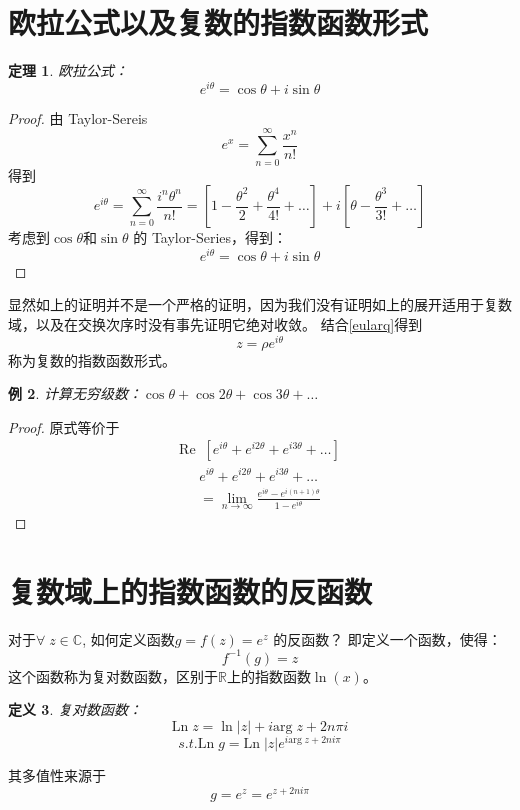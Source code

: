 \documentclass[10pt, a4paper, oneside]{ctexbook}
\newtheorem{theorem}{定理}[section]
\newtheorem{definition}[theorem]{定义}
\newtheorem{example}[theorem]{例}
\begin{document}
\section{欧拉公式以及复数的指数函数形式}

\begin{theorem}
    欧拉公式：
    $$e^{i\theta}=\cos \theta + i \sin \theta$$
\end{theorem}
\begin{proof}
    由 Taylor-Sereis
    $$
        e^x= \sum_{n=0}^\infty \frac{x^n}{n!}
    $$
    得到
    $$
        e^{i\theta}= \sum_{n=0}^\infty \frac{i^n\theta^n}{n!}=\left[ 1-\frac{\theta^2}{2}+\frac{\theta^4}{4!}+\dots \right]+ i \left[ \theta-\frac{\theta^3}{3!}+\dots \right]
    $$
    考虑到$\cos \theta$和$\sin \theta$ 的 Taylor-Series，得到：
    $$
        e^{i\theta}= \cos \theta + i \sin \theta
    $$
\end{proof}
显然如上的证明并不是一个严格的证明，因为我们没有证明如上的展开适用于复数域，以及在交换次序时没有事先证明它绝对收敛。
结合\ref{eularq}得到$$z=\rho e^{i\theta}$$称为复数的指数函数形式。
\begin{example}
    计算无穷级数：$\cos \theta + \cos 2\theta + \cos 3\theta + \dots$
\end{example}
\begin{proof}
    原式等价于
    \begin{align*}
        \mathrm{Re} \;\; [e^{i\theta}+e^{i2\theta}+e^{i3\theta}+\dots]
    \end{align*}
    \begin{align*}
        e^{i\theta}+e^{i2\theta}+e^{i3\theta}+\dots \\
        =\lim_{n\to \infty} \frac{\displaystyle e^{i\theta}-e^{i(n+1)\theta}}{\displaystyle 1-e^{i\theta}}
    \end{align*}
\end{proof}

\section{复数域上的指数函数的反函数}
对于$\forall \; z\in \mathbb{C}$, 如何定义函数$g=f(z)=e^{z}$ 的反函数？
即定义一个函数，使得：
\begin{equation*}
    f^{-1}(g)=z
\end{equation*}
这个函数称为复对数函数，区别于$\mathbb{R}$上的指数函数$\ln(x)$。
\begin{definition}
    复对数函数：$$\mathrm{Ln}\;z=\ln |z| + i\mathrm{arg} \;z +2n\pi i$$
    $$s.t. \mathrm{Ln}\;g  = \mathrm{Ln}\; |z|e^{i\mathrm{arg}\;z+2ni\pi} $$
\end{definition}
其多值性来源于
$$
    g=e^z=e^{z+2ni\pi}
$$
\end{document}
